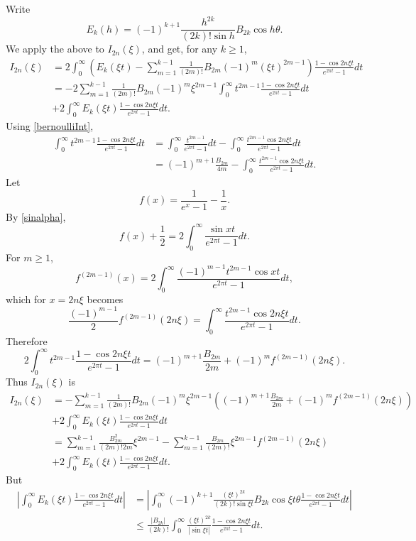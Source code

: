 \documentclass{amsart}
\begin{document}
Write
\[
E_k(h) = (-1)^{k+1} \frac{h^{2k}}{(2k)! \sin h}B_{2k} \cos h\theta.
\]
We apply the above to $I_{2n}(\xi)$, and get, for any $k \geq 1$,
\begin{align*}
I_{2n}(\xi)&=2\int_0^\infty \left(E_k(\xi t)-
\sum_{m=1}^{k-1} \frac{1}{(2m)!} B_{2m} (-1)^m (\xi t)^{2m-1} \right) \frac{1-\cos 2n\xi t}{e^{2\pi t}-1} dt\\
&= -2\sum_{m=1}^{k-1} \frac{1}{(2m)!} B_{2m} (-1)^m \xi^{2m-1} \int_0^\infty  t^{2m-1} 
 \frac{1-\cos 2n\xi t}{e^{2\pi t}-1} dt\\
 &+2 \int_0^\infty E_k(\xi t)  \frac{1-\cos 2n\xi t}{e^{2\pi t}-1} dt.
\end{align*} 
Using \eqref{bernoulliInt},
\begin{align*}
 \int_0^\infty  t^{2m-1} 
 \frac{1-\cos 2n\xi t}{e^{2\pi t}-1} dt&=
 \int_0^\infty \frac{t^{2m-1}}{e^{2\pi t}-1} dt
 -\int_0^\infty \frac{t^{2m-1} \cos 2n\xi t}{e^{2\pi t}-1} dt\\
 &=(-1)^{m+1} \frac{B_{2m}}{4m} -\int_0^\infty \frac{t^{2m-1} \cos 2n\xi t}{e^{2\pi t}-1} dt.
\end{align*}
Let
\[
f(x)=\frac{1}{e^x-1}-\frac{1}{x}.
\]
By \eqref{sinalpha},
\[
f(x)+\frac{1}{2} = 2 \int_0^\infty \frac{\sin x t}{e^{2\pi t}-1} dt.
\]
For $m \geq 1$, 
\[
f^{(2m-1)}(x) = 2\int_0^\infty \frac{(-1)^{m-1} t^{2m-1} \cos x t}{e^{2\pi t}-1} dt,
\]
which for $x=2n\xi$ becomes
\[
\frac{(-1)^{m-1}}{2} f^{(2m-1)}(2n\xi) = \int_0^\infty \frac{t^{2m-1} \cos 2n\xi t}{e^{2\pi t}-1} dt.
\]
Therefore
\[
2 \int_0^\infty  t^{2m-1} 
 \frac{1-\cos 2n\xi t}{e^{2\pi t}-1} dt
 =(-1)^{m+1} \frac{B_{2m}}{2m}+(-1)^{m} f^{(2m-1)}(2n\xi).
\]
Thus $I_{2n}(\xi)$ is
\begin{align*}
I_{2n}(\xi)&=-\sum_{m=1}^{k-1} \frac{1}{(2m)!} B_{2m} (-1)^m \xi^{2m-1} 
\left(
(-1)^{m+1} \frac{B_{2m}}{2m}+(-1)^{m} f^{(2m-1)}(2n\xi)
\right)
\\
 &+2 \int_0^\infty E_k(\xi t)  \frac{1-\cos 2n\xi t}{e^{2\pi t}-1} dt\\
 &=\sum_{m=1}^{k-1} \frac{B_{2m}^2}{(2m)! 2m} \xi^{2m-1}
 -\sum_{m=1}^{k-1} \frac{B_{2m}}{(2m)!} \xi^{2m-1} f^{(2m-1)}(2n\xi)\\
&+2 \int_0^\infty E_k(\xi t)  \frac{1-\cos 2n\xi t}{e^{2\pi t}-1} dt.
\end{align*}
But
\begin{align*}
\left| \int_0^\infty E_k(\xi t)  \frac{1-\cos 2n\xi t}{e^{2\pi t}-1} dt\right|&=
\left| \int_0^\infty (-1)^{k+1} \frac{(\xi t)^{2k}}{(2k)! \sin \xi t}B_{2k} \cos \xi t \theta 
 \frac{1-\cos 2n\xi t}{e^{2\pi t}-1} dt \right|\\
 &\leq \frac{|B_{2k}|}{(2k)!}  \int_0^\infty  \frac{(\xi t)^{2k}}{|\sin \xi t|} \frac{1-\cos 2n\xi t}{e^{2\pi t}-1} dt.
 \end{align*}
\end{document}
